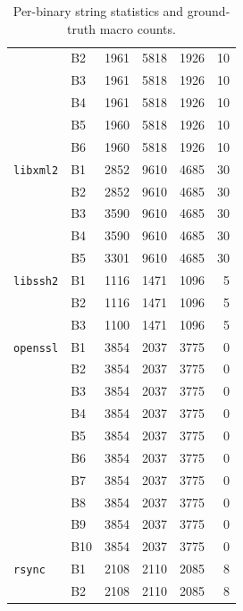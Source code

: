 \begin{table}[t]
\begin{tabular}{llrrrr}
& B2 & 1961 & 5818 & 1926 & 10 \\
& B3 & 1961 & 5818 & 1926 & 10 \\
& B4 & 1961 & 5818 & 1926 & 10 \\
& B5 & 1960 & 5818 & 1926 & 10 \\
& B6 & 1960 & 5818 & 1926 & 10 \\
\midrule
\texttt{libxml2}
& B1 & 2852 & 9610 & 4685 & 30 \\
& B2 & 2852 & 9610 & 4685 & 30 \\
& B3 & 3590 & 9610 & 4685 & 30 \\
& B4 & 3590 & 9610 & 4685 & 30 \\
& B5 & 3301 & 9610 & 4685 & 30 \\
\midrule
\texttt{libssh2}
& B1 & 1116 & 1471 & 1096 & 5 \\
& B2 & 1116 & 1471 & 1096 & 5 \\
& B3 & 1100 & 1471 & 1096 & 5 \\
\midrule
\texttt{openssl}
& B1 & 3854 & 2037 & 3775 & 0 \\
& B2 & 3854 & 2037 & 3775 & 0 \\
& B3 & 3854 & 2037 & 3775 & 0 \\
& B4 & 3854 & 2037 & 3775 & 0 \\
& B5 & 3854 & 2037 & 3775 & 0 \\
& B6 & 3854 & 2037 & 3775 & 0 \\
& B7 & 3854 & 2037 & 3775 & 0 \\
& B8 & 3854 & 2037 & 3775 & 0 \\
& B9 & 3854 & 2037 & 3775 & 0 \\
& B10 & 3854 & 2037 & 3775 & 0 \\
\midrule
\texttt{rsync}
& B1 & 2108 & 2110 & 2085 & 8 \\
& B2 & 2108 & 2110 & 2085 & 8 \\
\bottomrule
\end{tabular}
\caption{Per-binary string statistics and ground-truth macro counts.}
\end{table}
